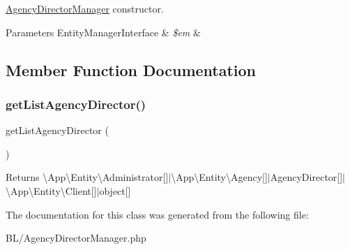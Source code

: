 \mbox{\hyperlink{class_app_1_1_b_l_1_1_agency_director_manager}{Agency\+Director\+Manager}} constructor. 
\begin{DoxyParams}[1]{Parameters}
Entity\+Manager\+Interface & {\em \$em} & \\
\hline
\end{DoxyParams}


\subsection{Member Function Documentation}
\mbox{\label{class_app_1_1_b_l_1_1_agency_director_manager_a267bd33e4c994768e98c18ff7ace416e}} 
\subsubsection{\texorpdfstring{getListAgencyDirector()}{getListAgencyDirector()}}
{\footnotesize\ttfamily get\+List\+Agency\+Director (\begin{DoxyParamCaption}{ }\end{DoxyParamCaption})}

\begin{DoxyReturn}{Returns}
\textbackslash{}\+App\textbackslash{}\+Entity\textbackslash{}\+Administrator\mbox{[}\mbox{]}$\vert$\textbackslash{}\+App\textbackslash{}\+Entity\textbackslash{}\+Agency\mbox{[}\mbox{]}$\vert$\+Agency\+Director\mbox{[}\mbox{]}$\vert$\textbackslash{}\+App\textbackslash{}\+Entity\textbackslash{}\+Client\mbox{[}\mbox{]}$\vert$object\mbox{[}\mbox{]} 
\end{DoxyReturn}


The documentation for this class was generated from the following file\+:\begin{DoxyCompactItemize}
\item 
B\+L/Agency\+Director\+Manager.\+php\end{DoxyCompactItemize}
